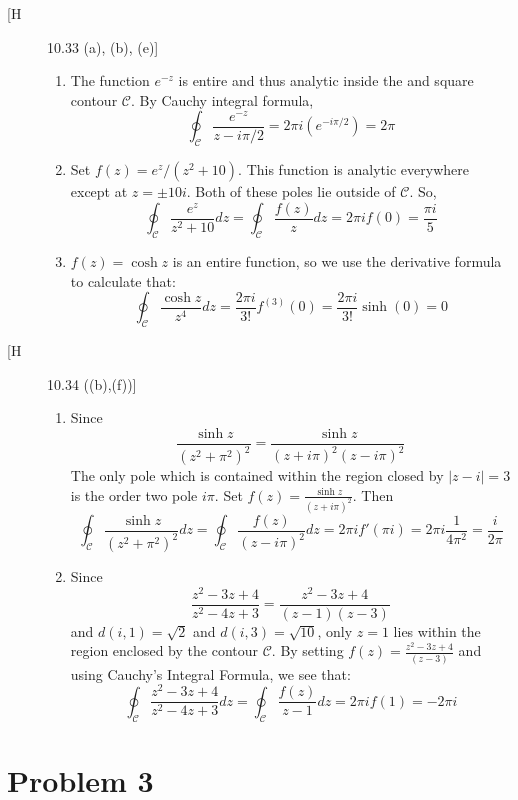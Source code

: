 \documentclass[12pt]{article}%
\newcommand{\C}{\mathcal{C}}
\begin{document}
\begin{description}
  \item[[H] 10.33 (a), (b), (e)]
  \begin{enumerate}
    \item

    The function $e^{-z}$ is entire and thus analytic inside the and square contour $\C$. By Cauchy integral formula,
    \[ \oint_{\C} \frac{e^{-z}}{z - i\pi/2} = 2\pi i (e^{-i\pi/2}) = 2\pi \]

    \item
    Set $f(z) = e^{z}/(z^2 + 10)$. This function is analytic everywhere except at $z = \pm 10i$. Both of these poles lie outside of $\C$. So,
    \[\oint_{\C} \frac{e^{z}}{z^2 + 10} dz = \oint_{\C} \frac{f(z)}{z} dz = 2\pi i f(0) = \frac{\pi i}{5}\]

    \item
    $f(z) = \cosh{z}$ is an entire function, so we use the derivative formula to calculate that:
    \[ \oint_{\C} \frac{\cosh{z}}{z^4} dz = \frac{2\pi i}{3!}f^{(3)}(0) =  \frac{2\pi i}{3!}\sinh(0) = 0\]
  \end{enumerate}

  \item[[H] 10.34 ((b),(f))]

  \begin{enumerate}
    \item Since \[ \frac{\sinh{z}}{(z^2 + \pi^2)^2} = \frac{\sinh{z}}{(z + i\pi )^2 (z - i \pi)^2} \] The only pole which is contained within the region closed by $|z - i| = 3$ is the order two pole $ i\pi$. Set $f(z) = \frac{\sinh{z}}{(z + i\pi)^2}$. Then
    \[  \oint_{\C} \frac{\sinh{z}}{(z^2 + \pi^2)^2} dz = \oint_{\C} \frac{f(z)}{(z - i\pi)^2} dz = 2\pi i f'(\pi i) = 2\pi i \frac{1}{4\pi^2} = \frac{i}{2\pi} \]

    \item
    Since \[ \frac{z^2 - 3z + 4}{z^2 -4z + 3} = \frac{z^2 - 3z  +4}{(z-1)(z-3)} \]
    and $d(i,1) = \sqrt{2}$ and $d(i,3) = \sqrt{10}$, only $z = 1$ lies within the region enclosed by the contour $\C$. By setting $f(z) = \frac{z^2 - 3z + 4}{(z-3)}$ and using Cauchy's Integral Formula, we see that:
    \[ \oint_{\C} \frac{z^2 - 3z + 4}{z^2 -4z + 3} dz = \oint_{\C} \frac{f(z)}{z-1} dz = 2\pi i f(1) = - 2 \pi i   \]
  \end{enumerate}
\end{description}

\section{Problem 3}
\end{document}
